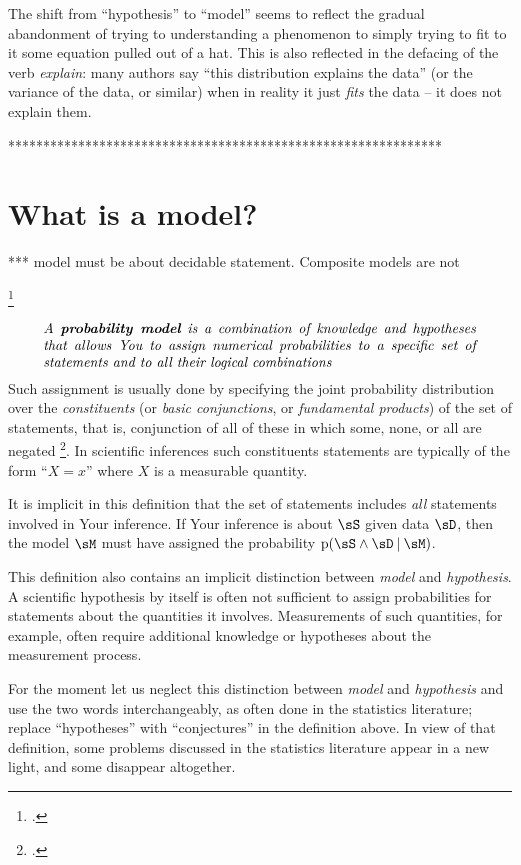 \documentclass[\ifafour a4paper,12pt,\else a5paper,10pt,\fi%
onecolumn,oneside,article,%
british%
]{memoir}
\theoremstyle{remark}
\theoremstyle{innote}
\newcommand*{\citep}{\footcites}
\newcommand*{\p}{\mathrm{p}}%
\renewcommand*{\|}[1][]{\nonscript\:#1\vert\nonscript\:\mathopen{}}
\renewcommand*{\=}{\TextOrMath\texteq\eq}
\newcommand*{\sect}{\S}%
\newcommand*{\chap}{ch.}%
\begin{document}
The shift from \enquote{hypothesis} to \enquote{model} seems to reflect the
gradual abandonment of trying to understanding a phenomenon to simply
trying to fit to it some equation pulled out of a hat. This is also
reflected in the defacing of the verb \emph{explain}: many authors say
\enquote{this distribution explains the data} (or the variance of the data,
or similar) when in reality it just \emph{fits} the data -- it does not explain
them.

**************************************************************


\section{What is a model?}
\label{sec:what_model}

*** model must be about decidable statement. Composite models are not


\citep[\sect~1.2]{hailperin2011}

\begin{equation}
  \parbox{0.9\linewidth}{\emph{A \textbf{probability model} is a combination of knowledge and hypotheses that allows You to assign numerical probabilities to a specific set of statements and to all their logical combinations}}
\label{eq:def_model}
\end{equation}
Such assignment is usually done by specifying the joint probability
distribution over the \emph{constituents} (or \emph{basic conjunctions}, or
\emph{fundamental products}) of the set of statements, that is, conjunction
of all of these in which some, none, or all are negated
\citep[\chap~0]{hailperin1996,hailperin2011}. In scientific inferences such
constituents statements are typically of the form \enquote{$X=x$} where $X$
is a measurable quantity.

It is implicit in this definition that the set of statements includes
\emph{all} statements involved in Your inference. If Your inference is
about $\sS$ given data $\sD$, then the model $\sM$ must have assigned the
probability $\p(\sS \land \sD \| \sM)$.

This definition also contains an implicit distinction between \emph{model}
and \emph{hypothesis}. A scientific hypothesis by itself is often not
sufficient to assign probabilities for statements about the quantities it
involves. Measurements of such quantities, for example, often require
additional knowledge or hypotheses about the measurement process.

For the moment let us neglect this distinction between \emph{model} and
\emph{hypothesis} and use the two words interchangeably, as often done in
the statistics literature; replace \enquote{hypotheses} with
\enquote{conjectures} in the definition above. In view of that definition,
some problems discussed in the statistics literature appear in a new light,
and some disappear altogether.
\end{document}
